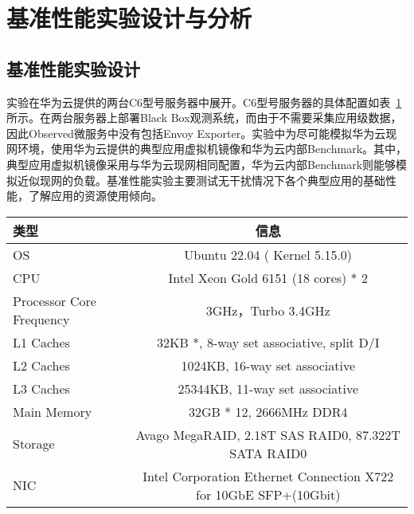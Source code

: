 \section{基准性能实验设计与分析}

\subsection{基准性能实验设计}

实验在华为云提供的两台C6型号服务器中展开。C6型号服务器的具体配置如表~\ref{tab:c6_info}所示。在两台服务器上部署Black Box观测系统，而由于不需要采集应用级数据，因此Observed微服务中没有包括Envoy Exporter。实验中为尽可能模拟华为云现网环境，使用华为云提供的典型应用虚拟机镜像和华为云内部Benchmark。其中，典型应用虚拟机镜像采用与华为云现网相同配置，华为云内部Benchmark则能够模拟近似现网的负载。基准性能实验主要测试无干扰情况下各个典型应用的基础性能，了解应用的资源使用倾向。

\begin{table}[!htbp]
    \label{tab:c6_info}
    \footnotesize%
    \setlength{\tabcolsep}{4pt}%
    \renewcommand{\arraystretch}{1.25}%
    \centering
    \begin{tabular}{lc}
        \hline
        类型 & 信息 \\
        \hline
        OS & Ubuntu 22.04 ( Kernel 5.15.0) \\
        CPU & Intel Xeon Gold 6151 (18 cores) * 2 \\
        Processor Core Frequency & 3GHz，Turbo 3.4GHz \\
        L1 Caches & 32KB *,  8-way set associative, split D/I \\
        L2 Caches & 1024KB, 16-way set associative \\
        L3 Caches & 25344KB, 11-way set associative \\
        Main Memory & 32GB * 12, 2666MHz DDR4 \\
        Storage & Avago MegaRAID, 2.18T SAS RAID0, 87.322T SATA RAID0 \\
        NIC & Intel Corporation Ethernet Connection X722 for 10GbE SFP+(10Gbit) \\
        \hline
    \end{tabular}
\end{table}



